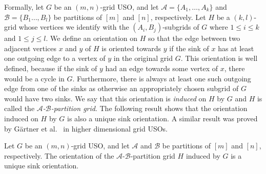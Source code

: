 \documentclass[runningheads,a4paper]{llncs}
\newcommand{\A}{\ensuremath{\mathcal A}}
\newcommand{\B}{\ensuremath{\mathcal B}}
\begin{document}
Formally, let $G$ be an $(m,n)$-grid USO,
and let $\A = \{A_1,\ldots,A_k\}$ and $\B = \{B_1\ldots, B_l\}$ be partitions of $[m]$ and $[n]$, respectively.
Let $H$ be a $(k,l)$-grid whose vertices we identify with the $(A_i,B_j)$-subgrids of $G$ where $1\leq i \leq k$ and $1 \leq j \leq l$. 
We define an orientation on $H$ so that the edge between two adjacent vertices $x$ and $y$ of $H$ is oriented towards $y$ if the sink of $x$ has at least one outgoing edge to a vertex of $y$ in the original grid $G$. 
This orientation is well defined, because if the sink of $y$ had an edge towards some vertex of $x$, there would be a cycle in $G$. 
Furthermore, there is always at least one such outgoing edge from one of the sinks as otherwise an appropriately chosen subgrid of $G$ would have two sinks. 
We say that this orientation is \emph{induced} on $H$ by $G$ and $H$ is called the \emph{$\A$-$\B$-partition grid}.
The following result shows that the orientation induced on $H$ by $G$ is also a unique sink orientation. 
A similar result was proved by G\"artner et al.~\cite{grid08} in higher dimensional grid USOs.




\begin{lemma}\label{lemma:USO-Lemma}
Let $G$ be an $(m,n)$-grid USO,
and let $\A$ and $\B$ be partitions of $[m]$ and $[n]$, respectively.
The orientation of the $\A$-$\B$-partition grid $H$ induced by $G$ is a unique sink orientation.
\end{lemma}
\end{document}

